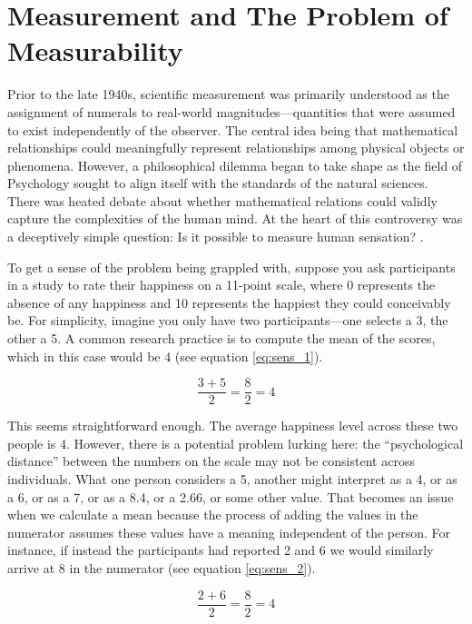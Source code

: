 \section{Measurement and The Problem of Measurability}

Prior to the late 1940s, scientific measurement was primarily understood as the assignment of numerals to real-world magnitudes—quantities that were assumed to exist independently of the observer. The central idea being that mathematical relationships could meaningfully represent relationships among physical objects or phenomena. However, a philosophical dilemma began to take shape as the field of Psychology sought to align itself with the standards of the natural sciences. There was heated debate about whether mathematical relations could validly capture the complexities of the human mind. At the heart of this controversy was a deceptively simple question: Is it possible to measure human sensation? \parencite[p. 677]{Stevens1946}.

To get a sense of the problem being grappled with, suppose you ask participants in a study to rate their happiness on a 11-point scale, where 0 represents the absence of any happiness and 10 represents the happiest they could conceivably be. For simplicity, imagine you only have two participants—one selects a 3, the other a 5. A common research practice is to compute the mean of the scores, which in this case would be 4 (see equation \ref{eq:sens_1}). 

\begin{equation}
\frac{3 + 5}{2} = \frac{8}{2} = 4
\label{eq:sens_1}
\end{equation}

\noindent
This seems straightforward enough. The average happiness level across these two people is 4. However, there is a potential problem lurking here: the ``psychological distance'' between the numbers on the scale may not be consistent across individuals. What one person considers a 5, another might interpret as a 4, or as a 6, or as a 7, or as a 8.4, or a 2.66, or some other value. That becomes an issue when we calculate a mean because the process of adding the values in the numerator assumes these values have a meaning independent of the person. For instance, if instead the participants had reported 2 and 6 we would similarly arrive at 8 in the numerator (see equation \ref{eq:sens_2}).

\begin{equation}
\frac{2 + 6}{2} = \frac{8}{2} = 4
\label{eq:sens_2}
\end{equation}

